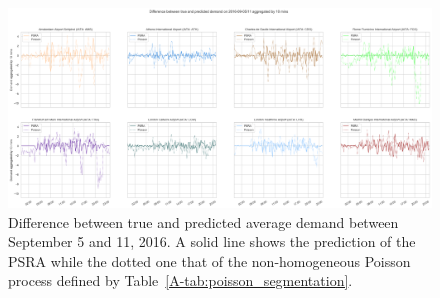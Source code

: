 \documentclass[final,review]{elsarticle}
\begin{document}
\begin{figure}
    \includegraphics[width=\textwidth]{prediction_last_week}
    \caption{Difference between true and predicted average demand between September 5 and 11, 2016. A solid line shows the prediction of the \acs{PSRA} while the dotted one that of the non-homogeneous Poisson process defined by Table~\ref{A-tab:poisson_segmentation}.}
    \label{fig:pred_last_week}
\end{figure}
\end{document}
